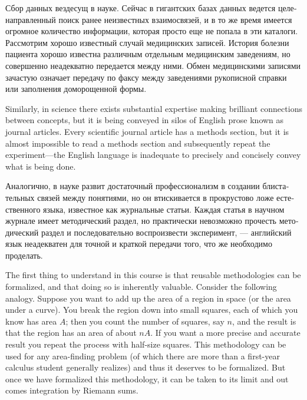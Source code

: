 \documentclass[a4paper]{book}
\theoremstyle{myth}
\begin{document}
\begin{russian}
Сбор данных вездесущ в науке. Сейчас в гигантских базах данных ведется целенаправленный поиск ранее неизвестных взаимосвязей, и в то же время имеется огромное количество информации, которая просто еще не попала в эти каталоги. Рассмотрим хорошо известный случай медицинских записей. История болезни пациента хорошо известна различным отдельным медицинским заведениям, но совершенно неадекватно передается между ними. Обмен медицинскими записями зачастую означает передачу по факсу между заведениями рукописной справки или заполнения доморощенной формы. 

Similarly, in science there exists substantial expertise making brilliant connections between concepts, but it is being conveyed in silos of English prose known as journal articles. Every scientific journal article has a methods section, but it is almost impossible to read a methods section and subsequently repeat the experiment---the English language is inadequate to precisely and concisely convey what is being done.

Аналогично, в науке развит достаточный профессионализм в создании блистательных связей между понятиями, но он втискивается в прокрустово ложе естественного языка, известное как журнальные статьи. Каждая статья в научном журнале имеет методический раздел, но практически невозможно прочесть методический раздел и последовательно воспроизвести эксперимент, — английский язык неадекватен для точной и краткой передачи того, что же необходимо проделать. 

The first thing to understand in this course is that reusable methodologies can be formalized, and that doing so is inherently valuable. Consider the following analogy. Suppose you want to add up the area of a region in space (or the area under a curve). You break the region down into small squares, each of which you know has area $A$; then you count the number of squares, say $n$, and the result is that the region has an area of about $nA$. If you want a more precise and accurate result you repeat the process with half-size squares. This methodology can be used for any area-finding problem (of which there are more than a first-year calculus student generally realizes) and thus it deserves to be formalized. But once we have formalized this methodology, it can be taken to its limit and out comes integration by Riemann sums.


\end{russian}
\end{document}
